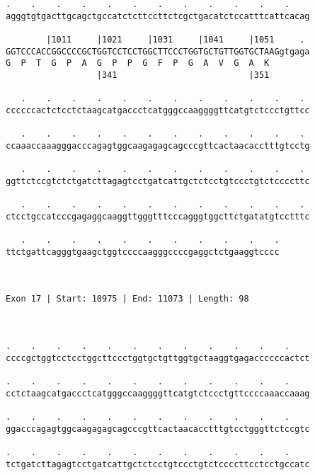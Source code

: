 \documentclass{article}
\begin{document}
\begin{Verbatim}
.    .    .    .    .    .    .    .    .    .    .    .    
agggtgtgacttgcagctgccatctcttccttctcgctgacatctccatttcattcacag
                                                            
        |1011     |1021     |1031     |1041     |1051     . 
GGTCCCACCGGCCCCGCTGGTCCTCCTGGCTTCCCTGGTGCTGTTGGTGCTAAGgtgaga
G  P  T  G  P  A  G  P  P  G  F  P  G  A  V  G  A  K        
                  |341                          |351        
  
   .    .    .    .    .    .    .    .    .    .    .    . 
ccccccactctcctctaagcatgaccctcatgggccaaggggttcatgtctccctgttcc
                                                            
   .    .    .    .    .    .    .    .    .    .    .    . 
ccaaaccaaagggacccagagtggcaagagagcagcccgttcactaacacctttgtcctg
                                                            
   .    .    .    .    .    .    .    .    .    .    .    . 
ggttctccgtctctgatcttagagtcctgatcattgctctcctgtccctgtctccccttc
                                                            
   .    .    .    .    .    .    .    .    .    .    .    . 
ctcctgccatcccgagaggcaaggttgggtttcccagggtggcttctgatatgtcctttc
                                                            
   .    .    .    .    .    .    .    .    .    .    .
ttctgattcagggtgaagctggtccccaagggccccgaggctctgaaggtcccc
                                                      
                                                      
 
Exon 17 | Start: 10975 | End: 11073 | Length: 98



.    .    .    .    .    .    .    .    .    .    .    .    
ccccgctggtcctcctggcttccctggtgctgttggtgctaaggtgagaccccccactct
                                                            
.    .    .    .    .    .    .    .    .    .    .    .    
cctctaagcatgaccctcatgggccaaggggttcatgtctccctgttccccaaaccaaag
                                                            
.    .    .    .    .    .    .    .    .    .    .    .    
ggacccagagtggcaagagagcagcccgttcactaacacctttgtcctgggttctccgtc
                                                            
.    .    .    .    .    .    .    .    .    .    .    .    
tctgatcttagagtcctgatcattgctctcctgtccctgtctccccttcctcctgccatc
                                                            

\end{Verbatim}
\end{document}
